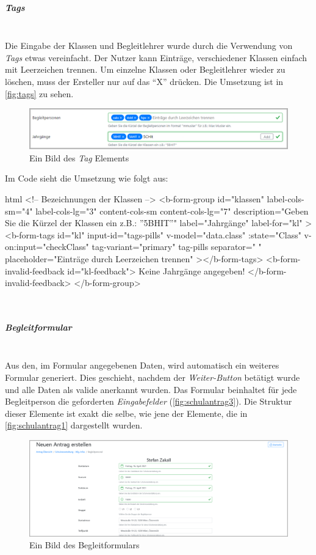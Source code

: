 \subparagraph{Tags}~\\
Die Eingabe der Klassen und Begleitlehrer wurde durch die Verwendung von \textit{Tags} etwas vereinfacht. Der Nutzer kann Einträge, verschiedener Klassen einfach mit Leerzeichen trennen. Um einzelne Klassen oder Begleitlehrer wieder zu löschen, muss der Ersteller nur auf das \enquote{X} drücken. Die Umsetzung ist in \autoref{fig:tags} zu sehen.
\begin{figure}[H]
	\centering
	\includegraphics[width=0.8\linewidth]{images/ldehner_implementierung/tags}
	\caption[Tags]{Ein Bild des \textit{Tag} Elements}
	\label{fig:tags}
\end{figure}
Im Code sieht die Umsetzung wie folgt aus:
\begin{code}{html}
<!-- Bezeichnungen der Klassen -->
<b-form-group
	id="klassen"
	label-cols-sm="4"
	label-cols-lg="3"
	content-cols-sm
	content-cols-lg="7"
	description="Geben Sie die Kürzel der Klassen ein z.B.: ''5BHIT''"
	label="Jahrgänge"
	label-for="kl"
>
	<b-form-tags
		id="kl"
		input-id="tags-pills"
		v-model="data.class"
		:state="Class"
		v-on:input="checkClass"
		tag-variant="primary"
		tag-pills
		separator=" "
		placeholder="Einträge durch Leerzeichen trennen"
	></b-form-tags>
	<b-form-invalid-feedback id="kl-feedback">
		Keine Jahrgänge angegeben!
	</b-form-invalid-feedback>
</b-form-group>
\end{code}
\label{list:tags} ~\\
\subparagraph{Begleitformular}~\\
Aus den, im Formular angegebenen Daten, wird automatisch ein weiteres Formular generiert. Dies geschieht, nachdem der \textit{Weiter-Button} betätigt wurde und alle Daten als valide anerkannt wurden. Das Formular beinhaltet für jede Begleitperson die geforderten \textit{Eingabefelder} (\autoref{fig:schulantrag3}). Die Struktur dieser Elemente ist exakt die selbe, wie jene der Elemente, die in \autoref{fig:schulantrag1} dargestellt wurden. 
\begin{figure}[H]
	\centering
	\includegraphics[width=1\linewidth]{images/ldehner_implementierung/schul_3_1}
	\caption[Begleitformular]{Ein Bild des Begleitformulars}
	\label{fig:schulantrag3}
\end{figure}
